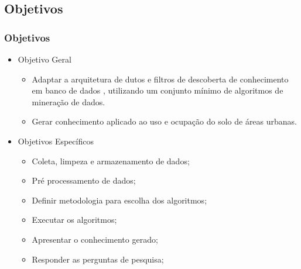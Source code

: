 \subsection{Objetivos}
\begin{frame}

    \frametitle{Objetivos}

    \begin{itemize}
    
        \item Objetivo Geral
            \begin{itemize}
                \item Adaptar a arquitetura de dutos e filtros de descoberta de conhecimento em banco de dados \cite{nwagu2017knowledge}, utilizando um conjunto mínimo de algoritmos de mineração de dados.
                \item Gerar conhecimento aplicado ao uso e ocupação do solo de áreas urbanas.
            \end{itemize}
            
        \item Objetivos Específicos
            \begin{itemize}
                \item Coleta, limpeza e armazenamento de dados;
                \item Pré processamento de dados;
                \item Definir metodologia para escolha dos algoritmos;
                \item Executar os algoritmos;
                \item Apresentar o conhecimento gerado;
                \item Responder as perguntas de pesquisa;
            \end{itemize}
            
    \end{itemize}

\end{frame}